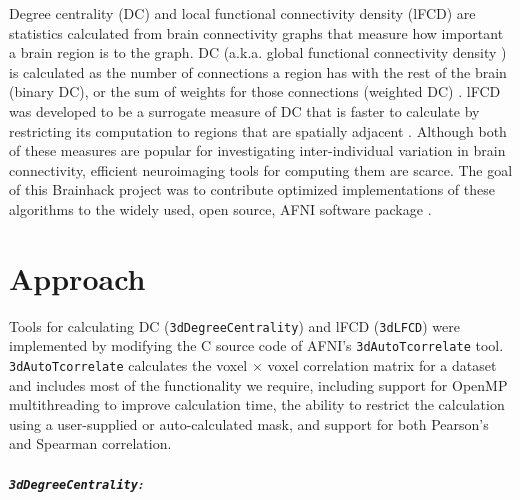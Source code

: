 \documentclass[twocolumn]{bmcart}%
\begin{document}
Degree centrality (DC) \cite{Rubinov2010} and local functional
connectivity density (lFCD) \cite{Tomasi2010} are statistics calculated
from brain connectivity graphs that measure how important a brain region
is to the graph. DC (a.k.a. global functional connectivity density
\cite{Tomasi2010}) is calculated as the number of connections a region
has with the rest of the brain (binary DC), or the sum of weights for
those connections (weighted DC) \cite{Rubinov2010}. lFCD was developed
to be a surrogate measure of DC that is faster to calculate by
restricting its computation to regions that are spatially adjacent
\cite{Tomasi2010}. Although both of these measures are popular for
investigating inter-individual variation in brain connectivity,
efficient neuroimaging tools for computing them are scarce. The goal of
this Brainhack project was to contribute optimized implementations of
these algorithms to the widely used, open source, AFNI software package
\cite{Cox1996}.

\section{Approach}\label{approach}

Tools for calculating DC (\texttt{3dDegreeCentrality}) and lFCD
(\texttt{3dLFCD}) were implemented by modifying the C source code of
AFNI's \texttt{3dAutoTcorrelate} tool. \texttt{3dAutoTcorrelate}
calculates the voxel \(\times\) voxel correlation matrix for a dataset
and includes most of the functionality we require, including support for
OpenMP \cite{Dagum1998} multithreading to improve calculation time, the
ability to restrict the calculation using a user-supplied or
auto-calculated mask, and support for both Pearson's and Spearman
correlation.

\subparagraph{\texorpdfstring{\texttt{3dDegreeCentrality}:}{:}}\label{section}
\end{document}
